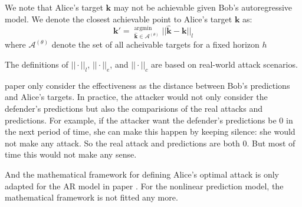 \documentclass[journal]{IEEEtran}
\begin{document}
We note that Alice’s target $\textbf{k}$ may not be achievable given Bob’s autoregressive model. We denote the closest achievable point to Alice’s target $\textbf{k}$ as:
\begin{equation}
    \textbf{k}'=\mathop{}_{\hat{\textbf{k}}\in \mathcal{A}^{(\theta)}}^{\text{argmin}}||\hat{\textbf{k}}-\textbf{k}||_{l}
\end{equation}
where $\mathcal{A}^{(\theta)}$ denote the set of all acheivable targets for a fixed horizon $h$

The definitions of $||\cdot||_{l}$, $||\cdot||_{e}$, and $||\cdot||_{c}$ are based on real-world attack scenarios. 

{\color{purple}
paper \cite{alfeld2016data} only consider the effectiveness as the distance between Bob's predictions and Alice's targets. In practice, the attacker would not only consider the defender's predictions but also the comparisions of the real attacks and predictions. For example, if the attacker want the defender's predictions be $0$ in the next period of time, she can make this happen by keeping silence: she would not make any attack. So the real attack and predictions are both $0$. But most of time this would not make any sense.

And the mathematical framework for defining Alice’s optimal attack is only adapted for the AR model in paper \cite{alfeld2016data}. For the nonlinear prediction model, the mathematical framework is not fitted any more.
}

\end{document}
